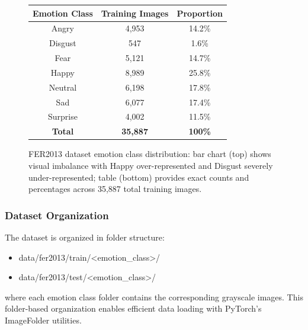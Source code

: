 \documentclass[12pt,a4paper]{article}
\begin{document}
\begin{figure}[h!]
    \centering
    
    \vspace{0.5cm}
    
    \begin{tabular}{|c|c|c|}
    \hline
    \textbf{Emotion Class} & \textbf{Training Images} & \textbf{Proportion} \\
    \hline
    Angry & 4,953 & 14.2\% \\
    Disgust & 547 & 1.6\% \\
    Fear & 5,121 & 14.7\% \\
    Happy & 8,989 & 25.8\% \\
    Neutral & 6,198 & 17.8\% \\
    Sad & 6,077 & 17.4\% \\
    Surprise & 4,002 & 11.5\% \\
    \hline
    \textbf{Total} & \textbf{35,887} & \textbf{100\%} \\
    \hline
    \end{tabular}
    \caption{FER2013 dataset emotion class distribution: bar chart (top) shows visual imbalance with Happy over-represented and Disgust severely under-represented; table (bottom) provides exact counts and percentages across 35,887 total training images.}
    \label{fig:fer2013_distribution}
\end{figure}

\subsubsection{Dataset Organization}
The dataset is organized in folder structure:
\begin{itemize}[leftmargin=*]
    \item data/fer2013/train/<emotion\_class>/
    \item data/fer2013/test/<emotion\_class>/
\end{itemize}
where each emotion class folder contains the corresponding grayscale images. This folder-based organization enables efficient data loading with PyTorch's ImageFolder utilities.
\end{document}
